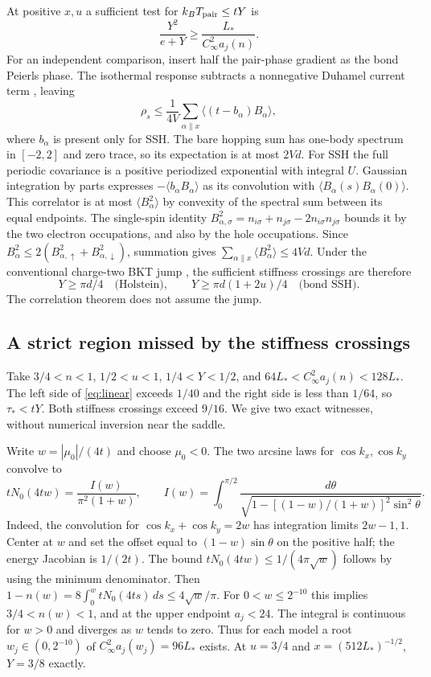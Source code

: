 \documentclass[11pt]{article}
\begin{document}
At positive $x,u$ a sufficient test for $k_BT_{\rm pair}\le tY$ is
\begin{equation}\label{eq:linear}
 \frac{Y^2}{e+Y}\ge\frac{L_*}{C_\infty^2a_j(n)} .
\end{equation}
For an independent comparison, insert half the pair-phase gradient as the bond Peierls phase. The isothermal response subtracts a nonnegative Duhamel current term \cite{hvr}, leaving
\[
 \rho_s\le \frac1{4V}\sum_{\alpha\parallel x}\langle(t-b_\alpha)B_\alpha\rangle ,
\]
where $b_\alpha$ is present only for SSH. The bare hopping sum has one-body spectrum in $[-2,2]$ and zero trace, so its expectation is at most $2Vd$. For SSH the full periodic covariance is a positive periodized exponential with integral $U$. Gaussian integration by parts expresses $-\langle b_\alpha B_\alpha\rangle$ as its convolution with $\langle B_\alpha(s)B_\alpha(0)\rangle$. This correlator is at most $\langle B_\alpha^2\rangle$ by convexity of the spectral sum between its equal endpoints. The single-spin identity $B_{\alpha,\sigma}^2=n_{i\sigma}+n_{j\sigma}-2n_{i\sigma}n_{j\sigma}$ bounds it by the two electron occupations, and also by the hole occupations. Since $B_\alpha^2\le2(B_{\alpha,\uparrow}^2+B_{\alpha,\downarrow}^2)$, summation gives $\sum_{\alpha\parallel x}\langle B_\alpha^2\rangle\le4Vd$. Under the conventional charge-two BKT jump \cite{nk}, the sufficient stiffness crossings are therefore
\[
 Y\ge\pi d/4\quad\text{(Holstein)},\qquad
 Y\ge\pi d(1+2u)/4\quad\text{(bond SSH)}.
\]
The correlation theorem does not assume the jump.

\subsection{A strict region missed by the stiffness crossings}
Take $3/4<n<1$, $1/2<u<1$, $1/4<Y<1/2$, and $64L_*<C_\infty^2a_j(n)<128L_*$. The left side of \eqref{eq:linear} exceeds $1/40$ and the right side is less than $1/64$, so $\tau_*<tY$. Both stiffness crossings exceed $9/16$. We give two exact witnesses, without numerical inversion near the saddle.

Write $w=|\mu_0|/(4t)$ and choose $\mu_0<0$. The two arcsine laws for $\cos k_x,\cos k_y$ convolve to
\[
 tN_0(4tw)=\frac{I(w)}{\pi^2(1+w)},\qquad
 I(w)=\int_0^{\pi/2}\frac{d\theta}{\sqrt{1-[(1-w)/(1+w)]^2\sin^2\theta}}.
\]
Indeed, the convolution for $\cos k_x+\cos k_y=2w$ has integration limits $2w-1,1$. Center at $w$ and set the offset equal to $(1-w)\sin\theta$ on the positive half; the energy Jacobian is $1/(2t)$. The bound $tN_0(4tw)\le1/(4\pi\sqrt w)$ follows by using the minimum denominator. Then $1-n(w)=8\int_0^w tN_0(4ts)\,ds\le4\sqrt w/\pi$. For $0<w\le2^{-10}$ this implies $3/4<n(w)<1$, and at the upper endpoint $a_j<24$. The integral is continuous for $w>0$ and diverges as $w$ tends to zero. Thus for each model a root $w_j\in(0,2^{-10})$ of $C_\infty^2a_j(w_j)=96L_*$ exists. At $u=3/4$ and $x=(512L_*)^{-1/2}$, $Y=3/8$ exactly.
\end{document}
